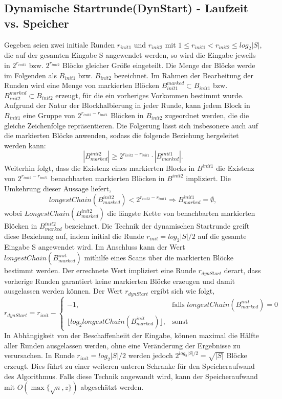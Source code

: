 \subsection{Dynamische Startrunde(DynStart) - Laufzeit vs. Speicher} \label{sec:dynstart}
Gegeben seien zwei initiale Runden $r_{init1}$ und $r_{init2}$ mit $1\leq r_{init1} < r_{init2}\leq log_2{|S|}$, die auf der gesamten Eingabe S angewendet werden, 
so wird die Eingabe jeweils in $2^{r_{init1}}$ bzw. $2^{r_{init2}}$ Blöcke gleicher Größe eingeteilt. Die Menge der Blöcke werde im Folgenden als $B_{init1}$ bzw. $B_{init2}$ bezeichnet.
Im Rahmen der Bearbeitung der Runden wird eine Menge von markierten Blöcken $B_{init1}^{marked}\subset B_{init1}$ bzw. $B_{init2}^{marked}\subset B_{init2}$ erzeugt, für die ein vorheriges
Vorkommen bestimmt wurde. Aufgrund der Natur der Blockhalbierung in jeder Runde, kann jedem Block in $B_{init1}$ eine Gruppe von $2^{r_{init2}-r_{init1}}$ Blöcken in $B_{init2}$ zugeordnet
werden, die die gleiche Zeichenfolge repräsentieren. Die Folgerung lässt sich insbesonere auch auf die markierten Blöcke anwenden, sodass die folgende Beziehung hergeleitet werden kann:
\begin{equation}
    |B^{init2}_{marked}| \geq 2^{r_{init2}-r_{init1}} \cdot |B^{init1}_{marked}|.
\end{equation}
Weiterhin folgt, dass die Existenz eines markierten Blocks in $B^{init1}$ die Existenz von $2^{r_{init2}-r_{init1}}$ benachbarten markierten Blöcken in $B^{init2}$ impliziert. Die
Umkehrung dieser Aussage liefert,
\begin{equation}
    longestChain(B^{init2}_{marked}) < 2^{r_{init2}-r_{init1}} \Rightarrow B^{init1}_{marked}=\emptyset, 
\end{equation}
wobei $LongestChain(B^{init2}_{marked})$ die längste Kette von benachbarten markierten Blöcken in $B^{init2}_{marked}$ bezeichnet.
Die Technik der dynamischen Startrunde greift diese Beziehung auf, indem initial die Runde $r_{init}=log_2{|S|}/2$ auf die gesamte Eingabe S angewendet wird. Im Anschluss
kann der Wert $longestChain(B^{init}_{marked})$ mithilfe eines Scans über die markierten Blöcke bestimmt werden. Der errechnete Wert impliziert eine Runde $r_{dynStart}$ derart,
dass vorherige Runden garantiert keine markierten Blöcke erzeugen und damit ausgelassen werden können. Der Wert $r_{dynStart}$ ergibt sich wie folgt,
\begin{equation}
    r_{dynStart} = r_{init}-
    \begin{cases}
        -1, & \text{falls } longestChain(B^{init}_{marked}) = 0\\
        \lfloor log_2{longestChain(B^{init}_{marked})} \rfloor, & \text{sonst}
    \end{cases}
\end{equation}
In Abhängigkeit von der Beschaffenheiit der Eingabe, können maximal die Hälfte aller Runden ausgelassen werden, ohne eine Veränderung der Ergebnisse zu verursachen. In
Runde $r_{init}=log_2{|S|}/2$ werden jedoch $2^{log_2{|S|}/2}=\sqrt{|S|}$ Blöcke erzeugt. Dies führt zu einer weiteren unteren Schranke für den Speicheraufwand des Algorithmus.
Falls diese Technik angewandt wird, kann der Speicheraufwand mit $O(\max\{\sqrt{n}, z\})$ abgeschätzt werden.

